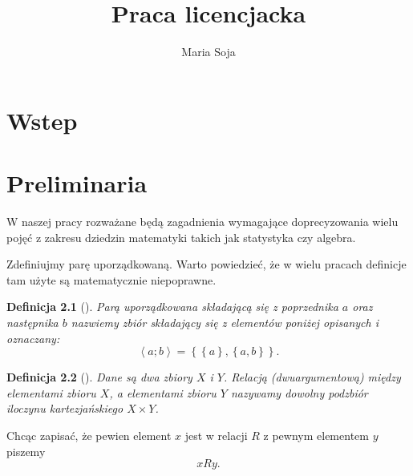\documentclass[12pt,a4paper]{report}
\author{Maria Soja}
\title{Praca licencjacka}
\newtheorem{definition}{Definicja}
\newcommand{\parauporzadkowana}[2]{\left\langle {#1}; {#2} \right\rangle}
\newcommand{\zbior}[1]{\left\lbrace {#1} \right\rbrace }
\begin{document}
\maketitle

\chapter{Wstep}

\chapter{Preliminaria}

%

W naszej pracy rozważane będą zagadnienia wymagające doprecyzowania wielu pojęć z zakresu dziedzin matematyki takich jak statystyka czy algebra. 


Zdefiniujmy parę uporządkowaną. Warto powiedzieć, że w wielu pracach definicje tam użyte są matematycznie niepoprawne.

\begin{definition}[\citep{kuratowski1966wstkep}]
Parą uporządkowana składającą się z poprzednika $a$ oraz następnika $b$ nazwiemy zbiór składający się z elementów poniżej opisanych i oznaczany:
\begin{equation*}
\parauporzadkowana{a}{b}=\zbior{\zbior{a}, \zbior{a,b}}.
\end{equation*}

\end{definition}


\begin{definition}[\citep{kraszewski2007wstkep}]
Dane są dwa zbiory $X$ i $Y$. Relacją (dwuargumentową) między elementami zbioru $X$, a elementami zbioru $Y$ nazywamy dowolny podzbiór iloczynu kartezjańskiego $X \times Y$.
\end{definition}
Chcąc zapisać, że pewien element $x$ jest w relacji $R$ z pewnym elementem $y$ piszemy
$$
xRy.
$$
\end{document}
